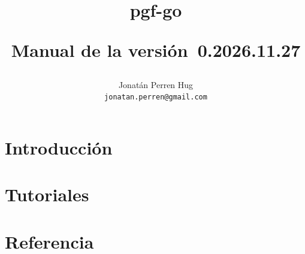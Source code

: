 \documentclass[a4paper,doc2]{ltxdoc}
\def\pgfgoversion{\leavevmode\hbox{0.2026.11.27}}
\begin{document}
	\title{\Huge\bfseries pgf-go\\[1em]
		\normalsize
		
		\begin{center}
			\begin{goban}[partial = B2:E3]
				
				
			\end{goban}
		\end{center}
		
		\large Manual de la versión~\pgfgoversion}
		\author{Jonat\'an Perren Hug\\
		\texttt{jonatan.perren@gmail.com}
		}
	
	\maketitle
	
	
	
	\label{table-of-contents}
	\tableofcontents

	\clearpage 

	\part{Introducción}
	

	\part{Tutoriales}\label{part:tutoriales}
	

	\part{Referencia}\label{part:referencia}
	
	
	
	
	
	
	
	
	
	
	

	\appendix
	
\end{document}
